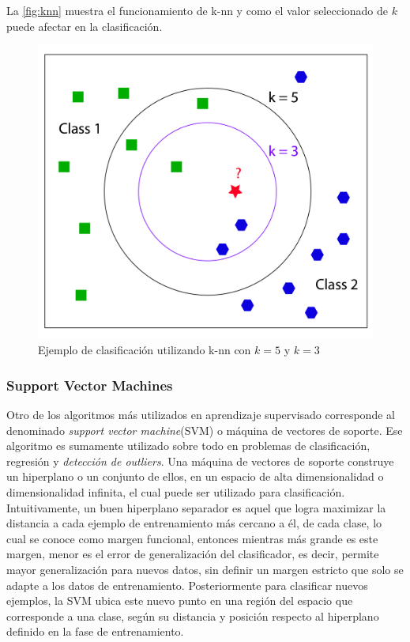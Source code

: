 La \autoref{fig:knn} muestra el funcionamiento de k-nn y como el valor seleccionado de $k$ puede afectar en la clasificación.

\newpage

\begin{figure}[ht!]
\centering
\includegraphics[width=.6\textwidth]{figures/knn.png}
\caption[Clasificación utilizando K-NN]{Ejemplo de clasificación utilizando k-nn con $k=5$ y $k=3$}
\label{fig:knn}
\end{figure}

\subsubsection{Support Vector Machines}

Otro de los algoritmos más utilizados en aprendizaje supervisado corresponde al denominado \textit{support vector machine}(SVM) o máquina de vectores de soporte. Ese algoritmo es sumamente utilizado sobre todo en problemas de clasificación, regresión y \textit{detección de outliers}. Una máquina de vectores de soporte construye un hiperplano o un conjunto de ellos, en un espacio de alta dimensionalidad o dimensionalidad infinita, el cual puede ser utilizado para clasificación. Intuitivamente, un buen hiperplano separador es aquel que logra maximizar la distancia a cada ejemplo de entrenamiento más cercano a él, de cada clase, lo cual se conoce como margen funcional, entonces mientras más grande es este margen, menor es el error de generalización del clasificador, es decir, permite mayor generalización para nuevos datos, sin definir un margen estricto que solo se adapte a los datos de entrenamiento. Posteriormente para clasificar nuevos ejemplos, la SVM ubica este nuevo punto en una región del espacio que corresponde a una clase, según su distancia y posición respecto al hiperplano definido en la fase de entrenamiento.

